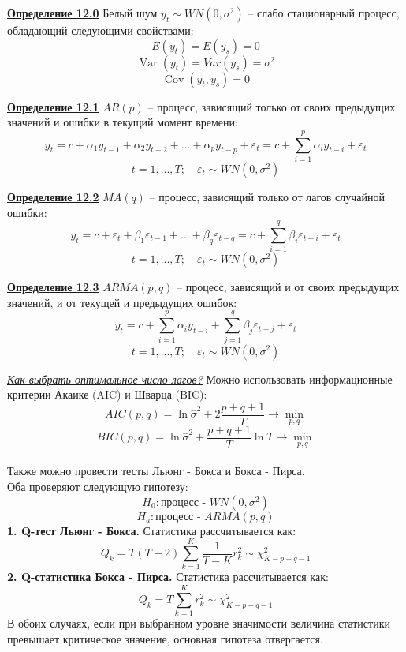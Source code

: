 \documentclass[a0,final]{a0poster}
\DeclareMathOperator{\Var}{Var}
\DeclareMathOperator{\Cov}{Cov}
\begin{document}
\begin{multicols}{4}
\begin{tcolorbox}[colback=green!5!white,colframe=green!75!black]
\textbf{\underline{Определение 12.0}} Белый шум $y_t \sim WN(0, \sigma^2)$ -- слабо стационарный процесс, обладающий следующими свойствами:
$$E(y_t)=E(y_s)=0$$
$$\Var(y_t) = Var(y_s) = \sigma^2 $$
$$\Cov(y_t,y_s) = 0$$
\end{tcolorbox}

\begin{tcolorbox}[colback=red!5!white,colframe=red!75!black]
\textbf{\underline{Определение 12.1}} $AR(p)$ -- процесс, зависящий только от своих предыдущих значений и ошибки в текущий момент времени: $$y_t = c + \alpha_1y_{t-1} + \alpha_2y_{t-2}+...+\alpha_py_{t-p} + \varepsilon_t = c + \sum\limits_{i=1}^p \alpha_iy_{t-i} + \varepsilon_t$$
$$t=1,...,T; \quad \varepsilon_t \sim WN(0, \sigma^2)$$
\end{tcolorbox}

\begin{tcolorbox}[colback=red!5!white,colframe=red!75!black]
\textbf{\underline{Определение 12.2}} $MA(q)$ -- процесс, зависящий только от лагов случайной ошибки: $$y_t = c +  \varepsilon_t + \beta_1\varepsilon_{t-1}+...+\beta_q\varepsilon_{t-q}= c + \sum\limits_{i=1}^q \beta_i\varepsilon_{t-i} + \varepsilon_t$$
$$t=1,...,T; \quad \varepsilon_t \sim WN(0, \sigma^2)$$
\end{tcolorbox}

\begin{tcolorbox}[colback=red!5!white,colframe=red!75!black]
\textbf{\underline{Определение 12.3}} $ARMA(p,q)$ -- процесс, зависящий и от своих предыдущих значений, и от текущей и предыдущих ошибок: $$y_t = c +  \sum\limits_{i=1}^p \alpha_iy_{t-i} + \sum\limits_{j=1}^q \beta_j\varepsilon_{t-j} + \varepsilon_t$$
$$t=1,...,T; \quad \varepsilon_t \sim WN(0, \sigma^2)$$
\end{tcolorbox}

\underline{\textit{Как выбрать оптимальное число лагов?}} Можно использовать информационные критерии Акаике (AIC) и Шварца (BIC):
$$AIC(p,q) = \ln\hat{\sigma}^2+2\frac{p+q+1}{T} \longrightarrow \min\limits_{p,q}$$
$$BIC(p,q) = \ln\hat{\sigma}^2 +\frac{p+q+1}{T}\ln T \longrightarrow \min\limits_{p,q}$$
\\
Также можно провести тесты Льюнг - Бокса и Бокса - Пирса.\\ Оба проверяют следующую гипотезу:
$$H_0: \text{процесс - } WN(0,\sigma^2)$$
$$H_a: \text{процесс - } ARMA(p,q) $$
\textbf{1. Q-тест Льюнг - Бокса.} Статистика рассчитывается как:
$$Q_k = T(T+2)\sum\limits_{k=1}^K \frac{1}{T-K}r^2_k \sim \chi^2_{K-p-q-1}$$
\textbf{2. Q-статистика Бокса - Пирса.} Статистика рассчитывается как:
$$Q_k = T\sum\limits_{k=1}^K r^2_k \sim \chi^2_{K-p-q-1}$$
В обоих случаях, если при выбранном уровне значимости величина статистики превышает критическое значение, основная гипотеза отвергается.\\



\end{multicols}
\end{document}

